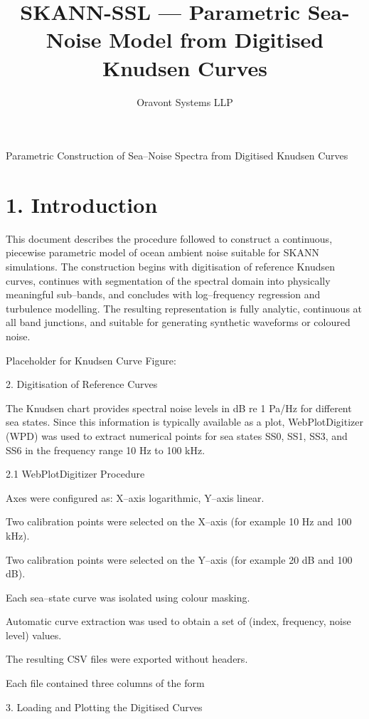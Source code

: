 \documentclass[12pt]{article}
\begin{document}
\title{SKANN-SSL --- Parametric Sea-Noise Model from Digitised Knudsen Curves}
\author{Oravont Systems LLP}
\date{}
\maketitle

Parametric Construction of Sea–Noise Spectra from Digitised Knudsen Curves

\section*{1. Introduction}
This document describes the procedure followed to construct a continuous, piecewise parametric model of ocean ambient noise suitable for SKANN simulations. The construction begins with digitisation of reference Knudsen curves, continues with segmentation of the spectral domain into physically meaningful sub–bands, and concludes with log–frequency regression and turbulence modelling. The resulting representation is fully analytic, continuous at all band junctions, and suitable for generating synthetic waveforms or coloured noise.

Placeholder for Knudsen Curve Figure:

2. Digitisation of Reference Curves

The Knudsen chart provides spectral noise levels in dB re 1 Pa/Hz for different sea states. Since this information is typically available as a plot, WebPlotDigitizer (WPD) was used to extract numerical points for sea states SS0, SS1, SS3, and SS6 in the frequency range 10 Hz to 100 kHz.

2.1 WebPlotDigitizer Procedure

Axes were configured as: X–axis logarithmic, Y–axis linear.

Two calibration points were selected on the X–axis (for example 10 Hz and 100 kHz).

Two calibration points were selected on the Y–axis (for example 20 dB and 100 dB).

Each sea–state curve was isolated using colour masking.

Automatic curve extraction was used to obtain a set of (index, frequency, noise level) values.

The resulting CSV files were exported without headers.

Each file contained three columns of the form


3. Loading and Plotting the Digitised Curves
\end{document}

